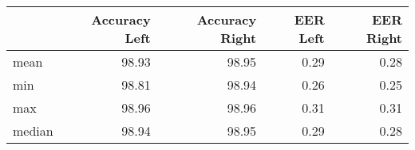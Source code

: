 \begin{tabular}{lrrrr}
\toprule
{} &  Accuracy Left &  Accuracy Right &  EER Left &  EER Right \\
\midrule
mean   &          98.93 &           98.95 &      0.29 &       0.28 \\
min    &          98.81 &           98.94 &      0.26 &       0.25 \\
max    &          98.96 &           98.96 &      0.31 &       0.31 \\
median &          98.94 &           98.95 &      0.29 &       0.28 \\
\bottomrule
\end{tabular}
